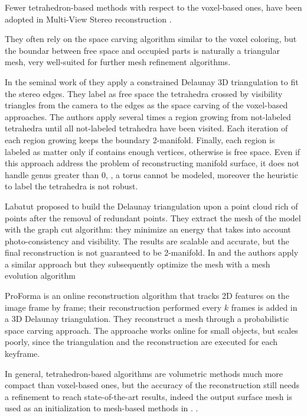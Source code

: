 Fewer tetrahedron-based methods with respect to the voxel-based ones, have been adopted in Multi-View Stereo reconstruction
\cite{faugeras_et_al_90,labatut2007efficient,salman2010surface,vu_et_al_2012,hiep2009towards,Pan_et_al09}.

They often rely on the space carving algorithm similar to the voxel coloring, but the boundar between free space and occupied parts is naturally a triangular mesh, very well-suited for further mesh refinement algorithms.

In the seminal work of \cite{faugeras_et_al_90} they apply a constrained Delaunay 3D triangulation to fit the stereo edges. They label  as free space the tetrahedra crossed by visibility triangles from the camera to the edges as the space carving of the voxel-based approaches. The authors apply several times a region growing from not-labeled tetrahedra  until all not-labeled tetrahedra have been visited. Each iteration of each region growing keeps the boundary 2-manifold. Finally, each region is labeled as matter only if contains enough vertices, otherwise is free space. 
Even if this approach address the problem of reconstructing manifold surface, it does not handle genus greater than 0, \eg, a torus cannot be modeled, moreover the heuristic to label the tetrahedra is not robust.

Labatut \etal \cite{labatut2007efficient} proposed to build the Delaunay triangulation upon a point cloud rich of points after the removal of redundant points. 
They extract the mesh of the model with the graph cut algorithm: they minimize an energy that takes into account photo-consistency and visibility. The results are scalable and accurate, but the final reconstruction is not guaranteed to be 2-manifold.
In \cite{hiep2009towards} and \cite{vu_et_al_2012} the authors apply a similar approach but they subsequently optimize the mesh with a mesh evolution algorithm

ProForma \cite{Pan_et_al09} is an online reconstruction algorithm that tracks 2D features on the image frame by frame; their reconstruction performed every $k$ frames is added in a 3D Delaunay triangulation. They reconstruct a mesh through a probabilistic space carving approach. The approache works online for small objects, but scales poorly, since the triangulation and the reconstruction are executed for each keyframe.

In general, tetrahedron-based algorithms are volumetric methods  much more compact than voxel-based ones, but the accuracy of the reconstruction still needs a refinement to reach state-of-the-art results, indeed the output surface mesh is used as an initialization to mesh-based methods in \cite{vu_et_al_2012,hiep2009towards,salman2010surface}.
.
